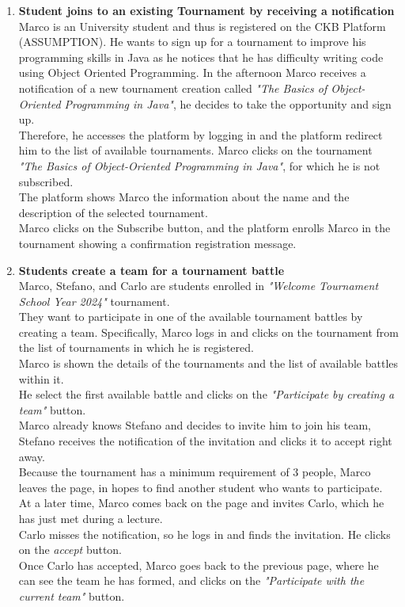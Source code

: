 \begin{enumerate}
	\item \textbf{Student joins to an existing Tournament by receiving a notification}\\
	      Marco is an University student and thus is registered on the CKB Platform (ASSUMPTION).
	      He wants to sign up for a tournament to improve his programming skills in Java as he notices that he has difficulty writing code using Object Oriented Programming.
	      In the afternoon Marco receives a notification of a new tournament creation called \emph{"The Basics of Object-Oriented Programming in Java"}, he decides to take the opportunity and sign up.\\
	      Therefore, he accesses the platform by logging in and the platform redirect him to the list of available tournaments. Marco clicks on the tournament \emph{"The Basics of Object-Oriented Programming in Java"}, for which he is not subscribed.\\
	      The platform shows Marco the information about the name and the description of the selected tournament. \\
	      Marco clicks on the Subscribe button, and the platform enrolls Marco in the tournament showing a confirmation registration message.

	\item \textbf{Students create a team for a tournament battle}\\
	      Marco, Stefano, and Carlo are students enrolled in \emph{"Welcome Tournament School Year 2024"} tournament.\\
	      They want to participate in one of the available tournament battles by creating a team.
	      Specifically, Marco logs in and clicks on the tournament from the list of tournaments in which he is registered.\\
	      Marco is shown the details of the tournaments and the list of available battles within it.\\
	      He select the first available battle and clicks on the \emph{"Participate by creating a team"} button.\\
	      Marco already knows Stefano and decides to invite him to join his team, Stefano receives the notification of the invitation and
	      clicks it to accept right away.\\
	      Because the tournament has a minimum requirement of 3 people, Marco leaves the page, in hopes to find another student who wants to participate.\\
	      At a later time, Marco comes back on the page and invites Carlo, which he has just met during a lecture.\\
	      Carlo misses the notification, so he logs in and finds the invitation. He clicks on the \emph{accept} button.\\
	      Once Carlo has accepted, Marco goes back to the previous page, where he can see the team he has formed,
	      and clicks on the \emph{"Participate with the current team"} button.


\end{enumerate}
